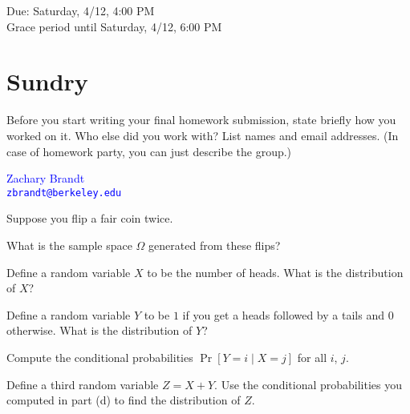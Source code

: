 \documentclass[11pt]{article}
\begin{document}
\maketitle
\fontsize{12}{15}\selectfont

\begin{center}
    Due: Saturday, 4/12, 4:00 PM \\
    Grace period until Saturday, 4/12, 6:00 PM \\
\end{center}

\section*{Sundry}
Before you start writing your final homework submission, state briefly how you 
worked on it.  Who else did you work with?  List names and email addresses. 
(In case of homework party, you can just describe the group.)

\begin{center}
    \textcolor{blue}{
        Zachary Brandt \\
        \nolinkurl{zbrandt@berkeley.edu}
    }
\end{center}

\vspace{15pt}


Suppose you flip a fair coin twice.
\begin{Parts}

\Part What is the sample space $\Omega$ generated from these flips?

\Part Define a random variable $X$ to be the number of heads. What is the 
distribution of $X$?

\Part Define a random variable $Y$ to be $1$ if you get a heads followed by a 
tails and $0$ otherwise. What is the distribution of $Y$?

\Part Compute the conditional probabilities $\Pr[Y = i \mid X = j]$ for all $i$, 
$j$.

\Part Define a third random variable $Z = X + Y$. Use the conditional 
probabilities you computed in part (d) to find the distribution of $Z$.

\end{Parts}
\end{document}
